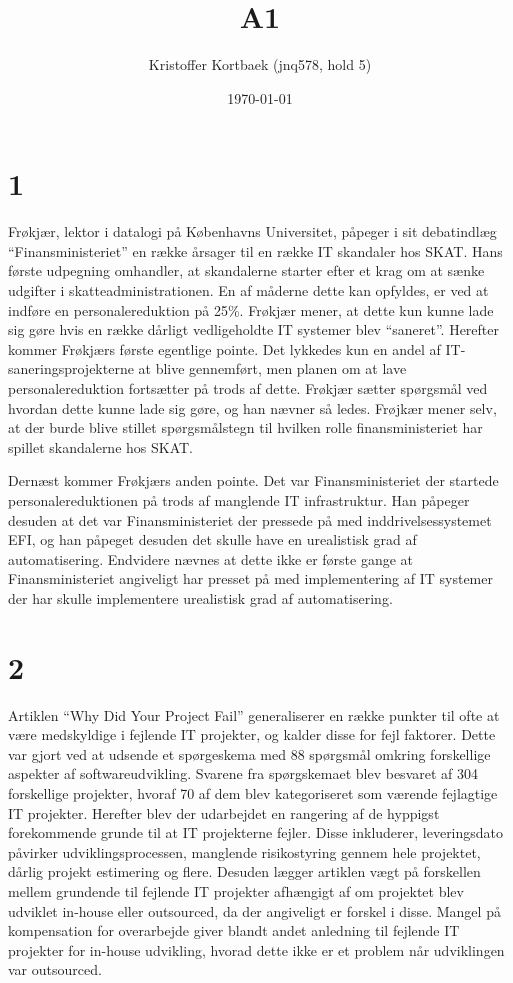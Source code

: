 \documentclass[11pt]{article}
\author{Kristoffer Kortbaek (jnq578, hold 5)}
\date{\today}
\title{A1}
\begin{document}
\maketitle
\tableofcontents


\section{1}
\label{sec:org928e6f6}
Frøkjær, lektor i datalogi på Københavns Universitet, påpeger i sit debatindlæg
``Finansministeriet''\cite{fk} en række
årsager til en række IT skandaler hos SKAT. Hans første udpegning omhandler, at
skandalerne starter efter et krag om at sænke udgifter i skatteadministrationen.
En af måderne dette kan opfyldes, er ved at indføre en personalereduktion på 25\%.
Frøkjær mener, at dette kun kunne lade sig gøre hvis en række dårligt vedligeholdte
IT systemer blev ``saneret''. Herefter kommer Frøkjærs første egentlige pointe. Det
lykkedes kun en andel af IT-saneringsprojekterne at blive gennemført, men planen
om at lave personalereduktion fortsætter på trods af dette.
Frøkjær sætter spørgsmål ved hvordan dette kunne lade sig gøre, og han nævner så
ledes. Frøjkær mener selv, at
der burde blive stillet spørgsmålstegn til hvilken rolle finansministeriet har
spillet skandalerne hos SKAT.

Dernæst kommer Frøkjærs anden pointe. Det var Finansministeriet der startede
personalereduktionen på trods af manglende IT infrastruktur. Han påpeger desuden
at det var Finansministeriet der pressede på med inddrivelsessystemet EFI, og han
påpeget desuden det skulle have en urealistisk grad af automatisering. Endvidere nævnes at dette ikke er første
gange at Finansministeriet angiveligt har presset på med implementering af IT
systemer der har skulle implementere urealistisk grad af automatisering.

\section{2}
\label{sec:orgb8d873b}
Artiklen ``Why Did Your Project Fail''\cite{cerpaverner} generaliserer en række
punkter til ofte at være medskyldige i fejlende IT projekter, og kalder disse for
fejl faktorer. Dette var gjort ved
at udsende et spørgeskema med 88 spørgsmål omkring forskellige aspekter af
softwareudvikling. Svarene fra spørgskemaet blev besvaret af 304 forskellige
projekter, hvoraf
70 af dem blev kategoriseret som værende fejlagtige IT projekter. Herefter blev
der udarbejdet en rangering af de hyppigst forekommende grunde til at IT
projekterne fejler. Disse inkluderer, leveringsdato påvirker udviklingsprocessen,
manglende risikostyring gennem hele projektet, dårlig projekt estimering og
flere. Desuden lægger artiklen vægt på forskellen mellem grundende til fejlende
IT projekter afhængigt af om projektet blev udviklet in-house eller outsourced,
da der angiveligt er forskel i disse. Mangel på kompensation for overarbejde
giver blandt andet anledning til fejlende IT projekter for in-house udvikling,
hvorad dette ikke er et problem når udviklingen var outsourced.
\end{document}
